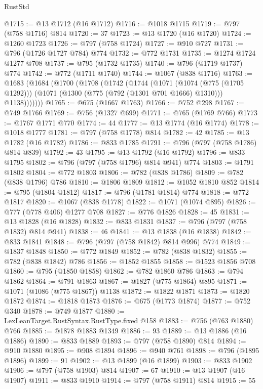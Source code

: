 \begin{lexlean}{RustStd}
\begin{coremodule}
@1715 := @13 @1712 (@16 @1712)
@1716 := @1018 @1715
@1719 := @797 (@758 @1716) @814
@1720 := 37
@1723 := @13 @1720 (@16 @1720)
@1724 := @1260 @1723
@1726 := @797 (@758 @1724)
@1727 := @910 @727
@1731 := @796 (@1726 @1727 @784) @774
@1732 := @772 @1731
@1735 := @1274 @1724 @1277 @708
@1737 := @795 (@1732 @1735)
@1740 := @796 (@1719 @1737) @774
@1742 := @772 (@1711 @1740)
@1744 := @1067 (@838 @1716)
@1763 := @1683
    (@1684
      (@1700
        (@1708
          (@1742
            (@1744
              (@1071
                (@1074 (@775 (@1705 @1292)))
                (@1071 (@1300 (@775 (@792 (@1301 @701 @1666) @1310))) @1138)))))))
@1765 := @675 (@1667 @1763)
@1766 := @752 @298
@1767 := @749 @1766
@1769 := @756 (@1327 @699)
@1771 := @765 (@1769 @766)
@1773 := @1767 @1771 @770
@1774 := 44
@1777 := @13 @1774 (@16 @1774)
@1778 := @1018 @1777
@1781 := @797 (@758 @1778) @814
@1782 := 42
@1785 := @13 @1782 (@16 @1782)
@1786 := @833 @1785
@1791 := @796 (@797 (@758 @1786) @814 @839)
@1792 := 43
@1795 := @13 @1792 (@16 @1792)
@1796 := @833 @1795
@1802 := @796 (@797 (@758 @1796) @814 @941) @774
@1803 := @1791 @1802
@1804 := @772 @1803
@1806 := @782 (@838 @1786)
@1809 := @782 (@838 @1796) @786
@1810 := @1806 @1809
@1812 := @1052 @1810 @852
@1814 := @795 (@1804 @1812)
@1817 := @796 (@1781 @1814) @774
@1818 := @772 @1817
@1820 := @1067 (@838 @1778)
@1822 := @1071 (@1074 @895)
@1826 := @777 (@778 @406) @1277 @708
@1827 := @776 @1826
@1828 := 45
@1831 := @13 @1828 (@16 @1828)
@1832 := @833 @1831
@1837 := @796 (@797 (@758 @1832) @814 @941)
@1838 := 46
@1841 := @13 @1838 (@16 @1838)
@1842 := @833 @1841
@1848 := @796 (@797 (@758 @1842) @814 @996) @774
@1849 := @1837 @1848
@1850 := @772 @1849
@1852 := @782 (@838 @1832)
@1855 := @782 (@838 @1842) @786
@1856 := @1852 @1855
@1858 := @1523 @1856 @708
@1860 := @795 (@1850 @1858)
@1862 := @782 @1860 @786
@1863 := @794 @1862
@1864 := @791 @1863
@1867 := @1827 (@775 @1864) @895
@1871 := @1071 (@1086 (@775 @1867)) @1138
@1872 := @1822 @1871
@1873 := @1820 @1872
@1874 := @1818 @1873
@1876 := @675 (@1773 @1874)
@1877 := @752 @340
@1878 := @749 @1877
@1880 := LexLeanTarget.RustSyntax.RustType.fixed @158
@1883 := @756 (@763 @1880) @766
@1885 := @1878 @1883 @1349
@1886 := 93
@1889 := @13 @1886 (@16 @1886)
@1890 := @833 @1889
@1893 := @797 (@758 @1890) @814
@1894 := @910 @1880
@1895 := @908 @1894
@1896 := @940 @761
@1898 := @796 (@1895 @1896)
@1899 := 91
@1902 := @13 @1899 (@16 @1899)
@1903 := @833 @1902
@1906 := @797 (@758 @1903) @814
@1907 := 67
@1910 := @13 @1907 (@16 @1907)
@1911 := @833 @1910
@1914 := @797 (@758 @1911) @814
@1915 := 55

\end{coremodule}
\end{lexlean}
